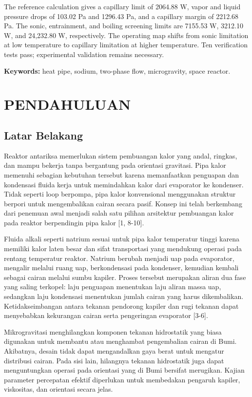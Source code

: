 \documentclass[
  12pt,
  12pt,a4paper,oneside]{report}
\providecommand{\mainmatter}{\clearpage\pagenumbering{arabic}}
\begin{document}
The reference calculation gives a capillary limit of 2064.88 W, vapor
and liquid pressure drops of 103.02 Pa and 1296.43 Pa, and a capillary
margin of 2212.68 Pa. The sonic, entrainment, and boiling screening
limits are 7155.53 W, 3212.10 W, and 24,232.80 W, respectively. The
operating map shifts from sonic limitation at low temperature to
capillary limitation at higher temperature. Ten verification tests pass;
experimental validation remains necessary.

\textbf{Keywords:} heat pipe, sodium, two-phase flow, microgravity,
space reactor.

\mainmatter

\hypertarget{pendahuluan}{%
\chapter{PENDAHULUAN}\label{pendahuluan}}

\hypertarget{latar-belakang}{%
\section{Latar Belakang}\label{latar-belakang}}

Reaktor antariksa memerlukan sistem pembuangan kalor yang andal,
ringkas, dan mampu bekerja tanpa bergantung pada orientasi gravitasi.
Pipa kalor memenuhi sebagian kebutuhan tersebut karena memanfaatkan
penguapan dan kondensasi fluida kerja untuk memindahkan kalor dari
evaporator ke kondenser. Tidak seperti loop berpompa, pipa kalor
konvensional menggunakan struktur berpori untuk mengembalikan cairan
secara pasif. Konsep ini telah berkembang dari penemuan awal menjadi
salah satu pilihan arsitektur pembuangan kalor pada reaktor berpendingin
pipa kalor {[}1, 8-10{]}.

Fluida alkali seperti natrium sesuai untuk pipa kalor temperatur tinggi
karena memiliki kalor laten besar dan sifat transportasi yang mendukung
operasi pada rentang temperatur reaktor. Natrium berubah menjadi uap
pada evaporator, mengalir melalui ruang uap, berkondensasi pada
kondenser, kemudian kembali sebagai cairan melalui sumbu kapiler. Proses
tersebut merupakan aliran dua fase yang saling terkopel: laju penguapan
menentukan laju aliran massa uap, sedangkan laju kondensasi menentukan
jumlah cairan yang harus dikembalikan. Ketidakseimbangan antara tekanan
pendorong kapiler dan rugi tekanan dapat menyebabkan kekurangan cairan
serta pengeringan evaporator {[}3-6{]}.

Mikrogravitasi menghilangkan komponen tekanan hidrostatik yang biasa
digunakan untuk membantu atau menghambat pengembalian cairan di Bumi.
Akibatnya, desain tidak dapat mengandalkan gaya berat untuk mengatur
distribusi cairan. Pada sisi lain, hilangnya tekanan hidrostatik juga
dapat menguntungkan operasi pada orientasi yang di Bumi bersifat
merugikan. Kajian parameter percepatan efektif diperlukan untuk
membedakan pengaruh kapiler, viskositas, dan orientasi secara jelas.
\end{document}
